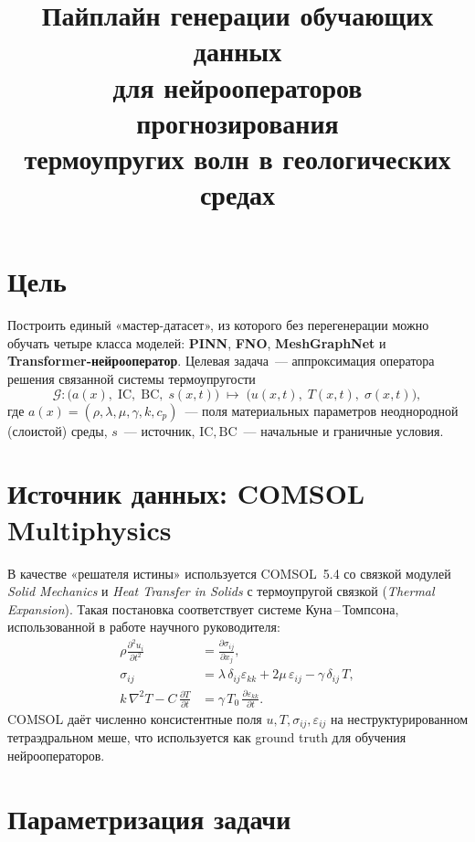 \documentclass[12pt]{article}
\title{Пайплайн генерации обучающих данных\\
для нейрооператоров прогнозирования\\
термоупругих волн в геологических средах}
\author{}
\date{}
\begin{document}
\maketitle

\section*{Цель}

Построить единый «мастер-датасет», из которого без перегенерации можно
обучать четыре класса моделей: \textbf{PINN}, \textbf{FNO},
\textbf{MeshGraphNet} и \textbf{Transformer-нейрооператор}. Целевая задача~---
аппроксимация оператора решения связанной системы термоупругости
\[
\mathcal{G}: \bigl(a(x),\; \mathrm{IC},\; \mathrm{BC},\; s(x,t)\bigr)
\;\longmapsto\;
\bigl(u(x,t),\; T(x,t),\; \sigma(x,t)\bigr),
\]
где $a(x)=(\rho,\lambda,\mu,\gamma,k,c_p)$~--- поля материальных параметров
неоднородной (слоистой) среды, $s$~--- источник, $\mathrm{IC},\mathrm{BC}$~---
начальные и граничные условия.

\section{Источник данных: COMSOL Multiphysics}

В качестве «решателя истины» используется COMSOL~5.4 со связкой модулей
\textit{Solid Mechanics} и \textit{Heat Transfer in Solids} с термоупругой
связкой (\textit{Thermal Expansion}). Такая постановка соответствует системе
Куна\,--\,Томпсона, использованной в работе научного руководителя:
\begin{align}
\rho \frac{\partial^2 u_i}{\partial t^2} &= \frac{\partial \sigma_{ij}}{\partial x_j},\\
\sigma_{ij} &= \lambda\,\delta_{ij}\varepsilon_{kk} + 2\mu\,\varepsilon_{ij}
              - \gamma\,\delta_{ij}\,T,\\
k\,\nabla^2 T - C\,\frac{\partial T}{\partial t}
              &= \gamma\,T_0\,\frac{\partial \varepsilon_{kk}}{\partial t}.
\end{align}
COMSOL даёт численно консистентные поля $u, T, \sigma_{ij}, \varepsilon_{ij}$
на неструктурированном тетраэдральном меше, что используется как
ground truth для обучения нейрооператоров.

\section{Параметризация задачи}
\end{document}
